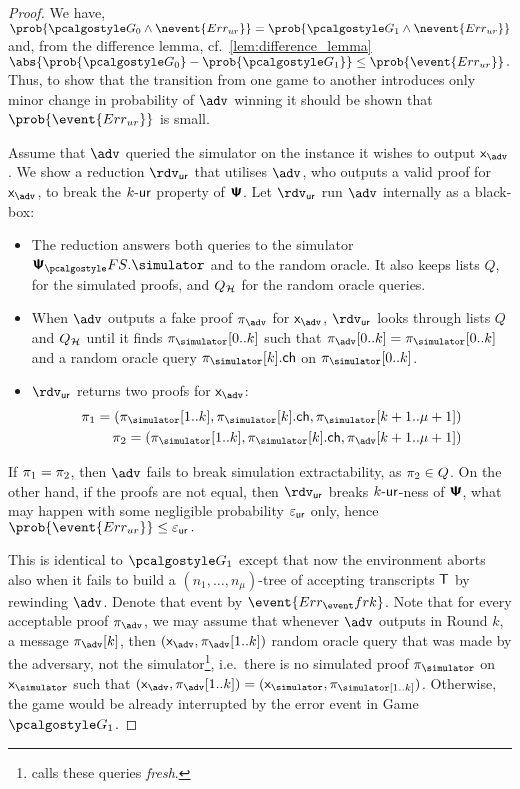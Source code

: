 \documentclass[runningheads,11pt]{llncs}
\theoremstyle{definition} \newtheorem{definition}[theorem]{Definition}
\begin{document}
\begin{proof}
   We have, \( \prob{\game{0} \land
    \nevent{\errur}} = \prob{\game{1} \land \nevent{\errur}} \) and, from the
  difference lemma, cf.~\cref{lem:difference_lemma} \( \abs{\prob{\game{0}} -
    \prob{\game{1}}} \leq \prob{\event{\errur}}\,. \) Thus, to show that the
  transition from one game to another introduces only minor change in
  probability of $\advse$ winning it should be shown that
  $\prob{\event{\errur}}$ is small.

  Assume that $\advse$ queried the simulator on the instance it wishes to output
  $\inp_{\advse}$. We show a reduction $\rdvur$ that utilises $\advse$, who
  outputs a valid proof for $\inp_{\advse}$, to break the ${k\text{-}\mathsf{ur}}$ property of
  $\bm{\mathsf{\Psi}}$. Let $\rdvur$ run $\advse$ internally as a black-box:
  \begin{itemize}
  \item The reduction answers both queries to the simulator $\psfs.\simulator$
    and to the random oracle. It also keeps lists $Q$, for the simulated proofs,
    and $Q_{\mathcal{H}}$ for the random oracle queries.
  \item When $\advse$ outputs a fake proof $\zkproof_{\advse}$ for
    $\inp_{\advse}$, $\rdvur$ looks through lists $Q$ and $Q_{\mathcal{H}}$ until it finds
    $\zkproof_{\simulator}[0..k]$ such that $\zkproof_{\advse}[0..k] =
    \zkproof_{\simulator}[0..k]$ and a random oracle query
    $\zkproof_{\simulator}[k].\ch$ on $\zkproof_{\simulator}[0..k]$.
  \item $\rdvur$ returns two proofs for $\inp_{\advse}$:
    \begin{align*}
      \zkproof_1 = (\zkproof_{\simulator}[1..k],
      \zkproof_{\simulator}[k].\ch, \zkproof_{\simulator}[k + 1..\mu + 1])\\
      \zkproof_2 = (\zkproof_{\simulator}[1..k],
      \zkproof_{\simulator}[k].\ch, \zkproof_{\advse}[k + 1..\mu + 1])
    \end{align*}
  \end{itemize}
  If $\pi_1 = \pi_2$, then $\advse$ fails to break simulation
  extractability, as $\pi_2 \in Q$. On the other hand, if the proofs are
  not equal, then $\rdvur$ breaks ${k\text{-}\mathsf{ur}}$-ness of $\bm{\mathsf{\Psi}}$, what may happen with
  some negligible probability $\varepsilon_{\mathsf{ur}}$ only, hence \( \prob{\event{\errur}} \leq
  \epsur\,. \)
	
   This is identical to $\game{1}$ except that now the environment
  aborts also when it fails to build a $(n_1, \ldots, n_\mu)$-tree of accepting
  transcripts $\mathsf{T}$ by rewinding $\advse$. Denote that event by
  $\event{\errfrk}$. Note that for every acceptable proof $\zkproof_{\advse}$,
  we may assume that whenever $\advse$ outputs in Round $k$, a message
  $\zkproof_{\advse}[k]$, then $(\inp_{\advse}, \zkproof_{\advse}[1..k])$ random
  oracle query that was made by the adversary, not the
  simulator\footnote{\cite{INDOCRYPT:FKMV12} calls these queries \emph{fresh}.},
  i.e.~there is no simulated proof $\zkproof_\simulator$ on $\inp_\simulator$
  such that $(\inp_{\advse}, \zkproof_{\advse} [1..k]) = (\inp_\simulator,
  \zkproof_\simulator[1..k])$. Otherwise, the game would be already interrupted
  by the error event in Game $\game{1}$.


\end{proof}
\end{document}
